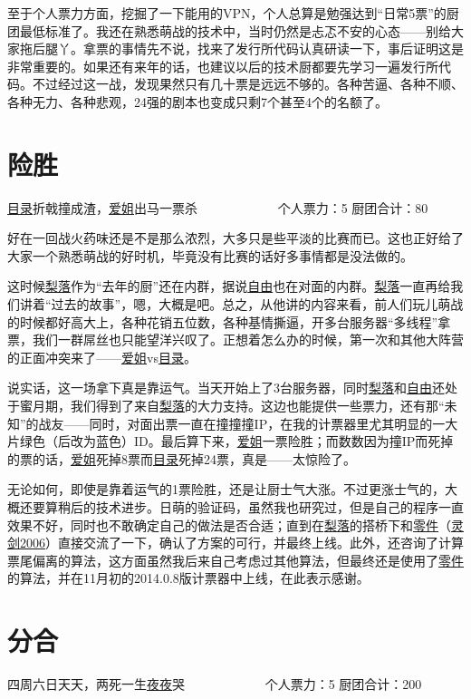 至于个人票力方面，挖掘了一下能用的VPN，个人总算是勉强达到“日常5票”的厨团最低标准了。我还在熟悉萌战的技术中，当时仍然是忐忑不安的心态——别给大家拖后腿丫。拿票的事情先不说，找来了发行所代码认真研读一下，事后证明这是非常重要的。如果还有来年的话，也建议以后的技术厨都要先学习一遍发行所代码。不过经过这一战，发现果然只有几十票是远远不够的。各种苦逼、各种不顺、各种无力、各种悲观，24强的剧本也变成只剩7个甚至4个的名额了。


\chapter{险胜}
\begin{center}
{\subTitle \uline{目录}折戟撞成渣，\uline{爱姐}出马一票杀}
\subMemo
　　　　　　个人票力：5 厨团合计：80
\end{center}

好在一回战火药味还是不是那么浓烈，大多只是些平淡的比赛而已。这也正好给了大家一个熟悉萌战的好时机，毕竟没有比赛的话好多事情都是没法做的。

这时候\uline{梨落}作为“去年的厨”还在内群，据说\uline{自由}也在对面的内群。\uline{梨落}一直再给我们讲着“过去的故事”，嗯，大概是吧。总之，从他讲的内容来看，前人们玩儿萌战的时候都好高大上，各种花销五位数，各种基情撕逼，开多台服务器“多线程”拿票，我们一群屌丝也只能望洋兴叹了。正想着怎么办的时候，第一次和其他大阵营的正面冲突来了——\uline{爱姐}vs\uline{目录}。

说实话，这一场拿下真是靠运气。当天开始上了3台服务器，同时\uline{梨落}和\uline{自由}还处于蜜月期，我们得到了来自\uline{梨落}的大力支持。这边也能提供一些票力，还有那“未知”的战友——同时，对面出票一直在撞撞撞IP，在我的计票器里尤其明显的一大片绿色（后改为蓝色）ID。最后算下来，\uline{爱姐}一票险胜；而数数因为撞IP而死掉的票的话，\uline{爱姐}死掉8票而\uline{目录}死掉24票，真是——太惊险了。

无论如何，即使是靠着运气的1票险胜，还是让厨士气大涨。不过更涨士气的，大概还要算稍后的技术进步。日萌的验证码，虽然我也研究过，但是自己的程序一直效果不好，同时也不敢确定自己的做法是否合适；直到在\uline{梨落}的搭桥下和\uline{零件}（\uline{灵剑2006}）直接交流了一下，确认了方案的可行，并最终上线。此外，还咨询了计算票尾偏离的算法，这方面虽然我后来自己考虑过其他算法，但最终还是使用了\uline{零件}的算法，并在11月初的2014.0.8版计票器中上线，在此表示感谢。

\chapter{分合}
\begin{center}
{\subTitle 四周六日天天，两死一生\uline{夜夜}哭}
\subMemo
　　　　　　个人票力：5 厨团合计：200
\end{center}

